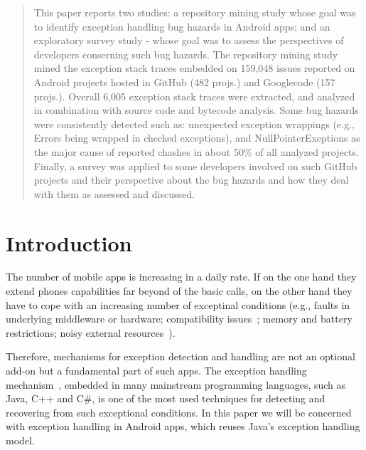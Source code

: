 \begin{abstract}
This paper reports two studies:  a repository mining study whose goal was to identify 
exception handling bug hazards in Android apps; and an exploratory survey study - whose goal
was to assess the perspectives of developers conserning such bug hazards.
The repository mining study mined the exception stack traces embedded on 
159,048 issues reported on Android projects hosted in GitHub (482 projs.) 
and Googlecode (157 projs.).  Overall 6,005 exception stack traces were extracted, 
and analyzed in combination with source code and bytecode analysis. 
Some bug hazards were consistently detected such as:  unexpected exception wrappings (e.g., Errors being wrapped in checked exceptions), and NullPointerExeptions as the major cause of reported chashes in about 50\% of all analyzed projects. Finally, a survey was applied to some developers 
involved on such GitHub projects and their perspective about the bug hazards and 
how they deal with them as assessed and discussed.

\end{abstract}

\section{Introduction}
\label{intro}


The number of mobile apps is increasing in a daily rate. If on the one hand they
extend phones capabilities far beyond of the basic calls, on the other hand they have to 
cope with an increasing number of exceptinal conditions 
(e.g., faults in underlying middleware or hardware; compatibility issues~\cite{McDon13}; memory and battery restrictions; noisy external resources~\cite{Zhang12}). 

Therefore, mechanisms for exception detection and handling are not an optional add-on but a 
fundamental part of such apps. The exception handling mechanism~\cite{goodenough1975exception},
embedded in many mainstream programming languages, such as Java, C++ and C\#,
 is one of the most used techniques for detecting and recovering from such exceptional conditions.
In this paper we will be concerned with exception handling in Android apps,
which reuses Java's exception handling model.
 


